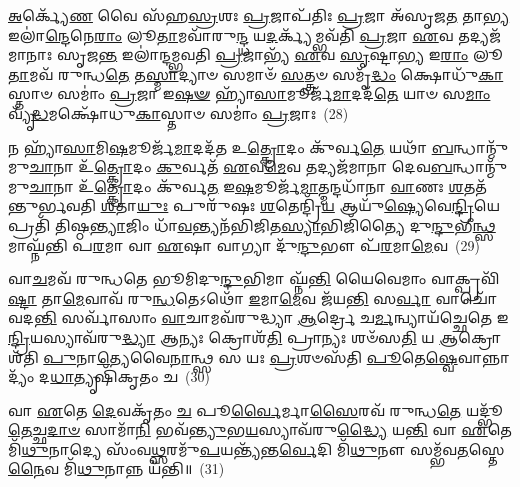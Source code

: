 {\anuvakamend[{𑌸𑌦᳴𑌸𑌃 𑌸𑌪𑍍𑌤\-\ul{𑌦}\-𑌶𑌂 \ul{𑌪𑍍𑌰}\-𑌜𑌾𑌪᳴𑌤𑍇𑌰𑍍𑌗𑌾𑌯𑌤𑌿 \ul{𑌦𑌿}\-𑌗𑍍𑌭𑍍𑌯 \ul{𑌏}\-𑌵𑌾𑌨𑍍𑌨𑌾\-\ul{𑌦𑍍𑌯}\-𑌮𑍍𑌪𑍍𑌰𑌤𑍍𑌯𑍇𑌕𑌾᳴\-𑌦𑌶 𑌚}]}%

\-\ul{𑌅}\-𑌰𑍍𑌕𑍍𑌯𑍇᳴\-\ul{𑌣} 𑌵𑍈 𑌸᳴𑌹\-\ul{𑌸𑍍𑌰}\-𑌶𑌃 \ul{𑌪𑍍𑌰}\-𑌜𑌾𑌪᳴𑌤𑌿𑌃 \ul{𑌪𑍍𑌰}\-𑌜𑌾 𑌅᳴𑌸𑍃𑌜\-\ul{𑌤} 𑌤𑌾\-\ul{𑌭𑍍𑌯} 𑌇𑌲𑌾॑\-\ul{𑌨𑍍𑌦𑍇}\-𑌨𑍇\-\ul{𑌰𑌾𑌂} 𑌲𑍂\-\ul{𑌤𑌾}\-𑌮𑌵𑌾᳴𑌰𑍁\-\ul{𑌨𑍍𑌦𑍍𑌧} 𑌯\-\ul{𑌦}\-𑌰𑍍𑌕𑍍𑌯᳴𑌮𑍍𑌭𑌵᳴𑌤𑌿 \ul{𑌪𑍍𑌰}\-𑌜𑌾 \ul{𑌏}\-𑌵 𑌤𑌦𑍍𑌯𑌜᳴𑌮𑌾𑌨𑌾𑌃 𑌸𑍃𑌜\-\ul{𑌨𑍍𑌤} 𑌇𑌲𑌾॑𑌨𑍍𑌦𑌮𑍍𑌭𑌵𑌤𑌿 \ul{𑌪𑍍𑌰}\-𑌜𑌾𑌭𑍍𑌯᳴ \ul{𑌏}\-𑌵 \ul{𑌸𑍃}\-𑌷𑍍𑌟𑌾\-\ul{𑌭𑍍𑌯} 𑌇\-\ul{𑌰𑌾𑌂} 𑌲𑍂\-\ul{𑌤𑌾}\-𑌮𑌵᳴ 𑌰𑍁𑌨𑍍𑌧\-\ul{𑌤𑍇} 𑌤\-\ul{𑌸𑍍𑌮𑌾}\-𑌦𑍍𑌯𑌾𑍞 𑌸𑌮𑌾𑍞᳴ \ul{𑌸}\-𑌤𑍍𑌤𑍍𑌰𑍞 𑌸𑌮𑍃᳴\-\ul{𑌦𑍍𑌧𑌂} 𑌕𑍍𑌷𑍋𑌧𑍁᳴\-\ul{𑌕𑌾}\-𑌸𑍍𑌤𑌾𑍞 𑌸𑌮𑌾𑌂॑ \ul{𑌪𑍍𑌰}\-𑌜𑌾 𑌇\-\ul{𑌷}\-\-\ul{𑍟} 𑌹𑍍𑌯𑌾᳴\-\ul{𑌸𑌾}\-𑌮𑍂𑌰𑍍𑌜᳴\-\ul{𑌮𑌾}\-𑌦𑌦᳴\-\ul{𑌤𑍇} 𑌯𑌾𑍞 𑌸\-\ul{𑌮𑌾𑌂} 𑌵𑍍𑌯𑍃᳴\-\ul{𑌦𑍍𑌧}\-𑌮𑌕𑍍𑌷𑍋᳴𑌧𑍁\-\ul{𑌕𑌾}\-𑌸𑍍𑌤𑌾𑍞 𑌸𑌮𑌾𑌂॑ \ul{𑌪𑍍𑌰}\-𑌜𑌾𑌃~(28)

𑌨 𑌹𑍍𑌯𑌾᳴\-\ul{𑌸𑌾}\-𑌮𑌿\-\ul{𑌷}\-𑌮𑍂𑌰𑍍𑌜᳴\-\ul{𑌮𑌾}\-𑌦𑌦᳴𑌤 𑌉\-\ul{𑌤𑍍𑌕𑍍𑌰𑍋}\-𑌦𑌂 𑌕𑍁᳴𑌰𑍍𑌵\-\ul{𑌤𑍇} 𑌯𑌥𑌾᳴ \ul{𑌬}\-𑌨𑍍𑌧𑌾𑌨𑍍𑌮𑍁᳴𑌮𑍁\-\ul{𑌚𑌾}\-𑌨𑌾 𑌉᳴\-\ul{𑌤𑍍𑌕𑍍𑌰𑍋}\-𑌦𑌂 \ul{𑌕𑍁}\-𑌰𑍍𑌵𑌤᳴ \ul{𑌏}\-𑌵\-\ul{𑌮𑍇}\-𑌵 𑌤𑌦𑍍𑌯𑌜᳴𑌮𑌾𑌨𑌾 𑌦𑍇𑌵\-\ul{𑌬}\-𑌨𑍍𑌧𑌾𑌨𑍍𑌮𑍁᳴𑌮𑍁\-\ul{𑌚𑌾}\-𑌨𑌾 𑌉᳴\-\ul{𑌤𑍍𑌕𑍍𑌰𑍋}\-𑌦𑌂 𑌕𑍁᳴𑌰𑍍𑌵\-\ul{𑌤} 𑌇\-\ul{𑌷}\-𑌮𑍂𑌰𑍍𑌜᳴\-\ul{𑌮𑌾}\-𑌤𑍍𑌮𑌨𑍍𑌦𑌧𑌾᳴𑌨𑌾 \ul{𑌵𑌾}\-𑌣𑌃 \ul{𑌶}\-𑌤𑌤᳴𑌨𑍍𑌤𑍁𑌰𑍍𑌭𑌵𑌤𑌿 \ul{𑌶}\-𑌤𑌾\-\ul{𑌯𑍁𑌃} 𑌪𑍁𑌰𑍁᳴𑌷𑌃 \ul{𑌶}\-𑌤𑍇𑌨𑍍𑌦𑍍𑌰𑌿᳴\-\ul{𑌯} 𑌆𑌯𑍁᳴\-\ul{𑌷𑍍𑌯𑍇}\-𑌵𑍇\-\ul{𑌨𑍍𑌦𑍍𑌰𑌿}\-𑌯𑍇 𑌪𑍍𑌰𑌤𑌿᳴ 𑌤𑌿𑌷𑍍𑌠\-\ul{𑌨𑍍𑌤𑍍𑌯𑌾}\-𑌜𑌿𑌂 𑌧𑌾᳴\-\ul{𑌵}\-𑌨𑍍𑌤𑍍𑌯𑌨᳴𑌭𑌿𑌜𑌿𑌤\-\ul{𑌸𑍍𑌯𑌾}\-𑌭𑌿𑌜𑌿᳴𑌤𑍍𑌯𑍈 𑌦𑍁\-\ul{𑌨𑍍𑌦𑍁}\-𑌭𑍀\-\ul{𑌨𑍍𑌥𑍍𑌸}\-𑌮𑌾𑌘𑍍𑌨᳴𑌨𑍍𑌤𑌿 𑌪\-\ul{𑌰}\-𑌮𑌾 𑌵𑌾 \ul{𑌏}\-𑌷𑌾 𑌵𑌾𑌗𑍍𑌯𑌾 𑌦𑍁᳴\-\ul{𑌨𑍍𑌦𑍁}\-𑌭𑍗 𑌪᳴\-\ul{𑌰}\-𑌮𑌾\-\ul{𑌮𑍇}\-𑌵~(29)

𑌵𑌾\-\ul{𑌚}\-𑌮𑌵᳴ 𑌰𑍁𑌨𑍍𑌧𑌤𑍇 𑌭𑍂𑌮𑌿𑌦𑍁\-\ul{𑌨𑍍𑌦𑍁}\-𑌭𑌿𑌮𑌾 𑌘𑍍𑌨᳴\-\ul{𑌨𑍍𑌤𑌿} 𑌯𑍈𑌵𑍇𑌮𑌾𑌂 𑌵𑌾𑌕𑍍𑌪𑍍𑌰𑌵𑌿᳴\-\ul{𑌷𑍍𑌟𑌾} 𑌤𑌾\-\ul{𑌮𑍇}\-𑌵𑌾𑌵᳴ 𑌰𑍁\-\ul{𑌨𑍍𑌧}\-𑌤𑍇\-𑌽𑌥𑍋᳴ \ul{𑌇}\-𑌮𑌾\-\ul{𑌮𑍇}\-𑌵 𑌜᳴𑌯\-\ul{𑌨𑍍𑌤𑌿} 𑌸\-\ul{𑌰𑍍𑌵𑌾} 𑌵𑌾𑌚𑍋᳴ 𑌵𑌦\-\ul{𑌨𑍍𑌤𑌿} 𑌸𑌰𑍍𑌵𑌾᳴𑌸𑌾𑌂 \ul{𑌵𑌾}\-𑌚𑌾𑌮𑌵᳴𑌰𑍁𑌦𑍍𑌧𑍍𑌯𑌾 \ul{𑌆}\-𑌰𑍍𑌦𑍍𑌰𑍇 𑌚\-\ul{𑌰𑍍𑌮}\-𑌨𑍍𑌵𑍍𑌯𑌾𑌯᳴𑌚𑍍𑌛𑍇𑌤𑍇 𑌇\-\ul{𑌨𑍍𑌦𑍍𑌰𑌿}\-𑌯𑌸𑍍𑌯𑌾𑌵᳴𑌰𑍁\-\ul{𑌦𑍍𑌧𑍍𑌯𑌾} 𑌆𑌨𑍍𑌯𑌃 𑌕𑍍𑌰𑍋𑌶᳴\-\ul{𑌤𑌿} 𑌪𑍍𑌰𑌾𑌨𑍍𑌯𑌃 𑌶𑍞᳴𑌸\-\ul{𑌤𑌿} 𑌯 \ul{𑌆}\-𑌕𑍍𑌰𑍋𑌶᳴𑌤𑌿 \ul{𑌪𑍁}\-𑌨𑌾\-\ul{𑌤𑍍𑌯𑍇}\-𑌵𑍈\-\ul{𑌨𑌾}\-𑌨𑍍𑌥𑍍𑌸 𑌸 𑌯𑌃 \ul{𑌪𑍍𑌰}\-𑌶𑍞𑌸᳴𑌤𑌿 \ul{𑌪𑍂}\-𑌤𑍇\-\ul{𑌷𑍍𑌵𑍇}\-𑌵𑌾𑌨𑍍𑌨𑌾𑌦𑍍𑌯𑌂᳴ 𑌦\-\ul{𑌧𑌾}\-𑌤𑍍𑌯𑍃𑌷𑌿᳴𑌕𑍃𑌤𑌂 𑌚~(30)

𑌵𑌾 \ul{𑌏}\-𑌤𑍇 \ul{𑌦𑍇}\-𑌵𑌕𑍃᳴𑌤𑌂 \ul{𑌚} 𑌪𑍂\-\ul{𑌰𑍍𑌵𑍈}\-𑌰𑍍𑌮𑌾\-\ul{𑌸𑍈}\-𑌰𑌵᳴ 𑌰𑍁𑌨𑍍𑌧\-\ul{𑌤𑍇} 𑌯𑌦𑍍𑌭𑍂᳴\-\ul{𑌤𑍇}\-𑌚𑍍𑌛\-\ul{𑌦𑌾}\-\-\ul{𑍞} 𑌸𑌾𑌮𑌾᳴\-\ul{𑌨𑌿} 𑌭𑌵᳴\-\ul{𑌨𑍍𑌤𑍍𑌯𑍁}\-𑌭\-\ul{𑌯}\-𑌸𑍍𑌯𑌾𑌵᳴𑌰𑍁\-\ul{𑌦𑍍𑌧𑍍𑌯𑍈} 𑌯\-\ul{𑌨𑍍𑌤𑌿} 𑌵𑌾 \ul{𑌏}\-𑌤𑍇 𑌮𑌿᳴\-\ul{𑌥𑍁}\-𑌨𑌾𑌦𑍍𑌯𑍇 𑌸𑌂᳴𑌵\-\ul{𑌥𑍍𑌸}\-𑌰𑌮𑍁᳴\-\ul{𑌪}\-𑌯𑌨𑍍𑌤𑍍𑌯᳴𑌨𑍍𑌤\-\ul{𑌰𑍍𑌵𑍇}\-𑌦𑌿 𑌮𑌿᳴\-\ul{𑌥𑍁}\-𑌨𑍗 𑌸𑌮𑍍𑌭᳴𑌵\-\ul{𑌤}\-𑌸𑍍𑌤𑍇\-\ul{𑌨𑍈}\-𑌵 𑌮𑌿᳴\-\ul{𑌥𑍁}\-𑌨𑌾𑌨𑍍𑌨 𑌯᳴𑌨𑍍𑌤𑌿॥~(31)

{\anuvakamend[{𑌵𑍍𑌯𑍃᳴\-\ul{𑌦𑍍𑌧}\-𑌮𑌕𑍍𑌷𑍋᳴𑌧𑍁\-\ul{𑌕𑌾}\-𑌸𑍍𑌤𑌾𑍞 𑌸𑌮𑌾𑌂॑ \ul{𑌪𑍍𑌰}\-𑌜𑌾𑌃 𑌪᳴\-\ul{𑌰}\-𑌮𑌾\-\ul{𑌮𑍇}\-𑌵 𑌚᳴ \ul{𑌤𑍍𑌰𑌿}\-\-\ul{𑍞}\-𑌶𑌚𑍍𑌚᳴}]}%

